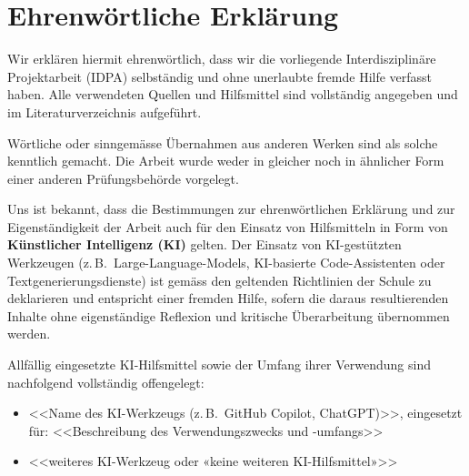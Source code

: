 
\chapter*{Ehrenwörtliche Erklärung}

Wir erklären hiermit ehrenwörtlich, dass wir die vorliegende
Interdisziplinäre Projektarbeit (IDPA) selbständig und ohne unerlaubte
fremde Hilfe verfasst haben. Alle verwendeten Quellen und Hilfsmittel
sind vollständig angegeben und im Literaturverzeichnis aufgeführt.

Wörtliche oder sinngemässe Übernahmen aus anderen Werken sind als solche
kenntlich gemacht. Die Arbeit wurde weder in gleicher noch in ähnlicher
Form einer anderen Prüfungsbehörde vorgelegt.

Uns ist bekannt, dass die Bestimmungen zur ehrenwörtlichen Erklärung und
zur Eigenständigkeit der Arbeit auch für den Einsatz von Hilfsmitteln in
Form von \textbf{Künstlicher Intelligenz (KI)} gelten. Der Einsatz von
KI-gestützten Werkzeugen (z.\,B.\ Large-Language-Models, KI-basierte
Code-Assistenten oder Text\-generierungs\-dienste) ist gemäss den
geltenden Richtlinien der Schule zu deklarieren und entspricht einer
fremden Hilfe, sofern die daraus resultierenden Inhalte ohne
eigenständige Reflexion und kritische Überarbeitung übernommen werden.

Allfällig eingesetzte KI-Hilfsmittel sowie der Umfang ihrer Verwendung
sind nachfolgend vollständig offengelegt:

\begin{itemize}
  \item <<Name des KI-Werkzeugs (z.\,B.\ GitHub Copilot, ChatGPT)>>,
        eingesetzt für: <<Beschreibung des Verwendungszwecks und -umfangs>>
  \item <<weiteres KI-Werkzeug oder «keine weiteren KI-Hilfsmittel»>>
\end{itemize}

